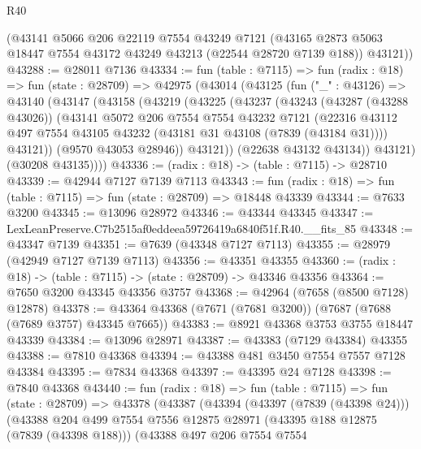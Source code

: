 \begin{lexlean}{R40}
\begin{coremodule}
      (@43141
        @5066
        @206
        @22119
        @7554
        @43249
        @7121
        (@43165 @2873 @5063 @18447 @7554 @43172 @43249 @43213 (@22544 @28720 @7139 @188))
        @43121))
@43288 := @28011 @7136
@43334 := fun (table : @7115) =>
  fun (radix : @18) =>
  fun (state : @28709) =>
  @42975
    (@43014
      (@43125
        (fun ("_" : @43126) =>
        @43140
          (@43147
            (@43158
              (@43219
                (@43225
                  (@43237
                    (@43243
                      (@43287 (@43288 @43026))
                      (@43141
                        @5072
                        @206
                        @7554
                        @7554
                        @43232
                        @7121
                        (@22316
                          @43112
                          @497
                          @7554
                          @43105
                          @43232
                          (@43181 @31 @43108 (@7839 (@43184 @31))))
                        @43121))
                    (@9570 @43053 @28946))
                  @43121))
              (@22638 @43132 @43134))
            @43121)
          (@30208 @43135))))
@43336 := (radix : @18) -> (table : @7115) -> @28710
@43339 := @42944 @7127 @7139 @7113
@43343 := fun (radix : @18) => fun (table : @7115) => fun (state : @28709) => @18448 @43339
@43344 := @7633 @3200
@43345 := @13096 @28972
@43346 := @43344 @43345
@43347 := LexLeanPreserve.C7b2515af0eddeea59726419a6840f51f.R40.__fits_85
@43348 := @43347 @7139
@43351 := @7639 (@43348 @7127 @7113)
@43355 := @28979 (@42949 @7127 @7139 @7113)
@43356 := @43351 @43355
@43360 := (radix : @18) -> (table : @7115) -> (state : @28709) -> @43346 @43356
@43364 := @7650 @3200 @43345 @43356 @3757
@43368 := @42964 (@7658 (@8500 @7128) @12878)
@43378 := @43364 @43368 (@7671 (@7681 @3200)) (@7687 (@7688 (@7689 @3757) @43345 @7665))
@43383 := @8921 @43368 @3753 @3755 @18447 @43339
@43384 := @13096 @28971
@43387 := @43383 (@7129 @43384) @43355
@43388 := @7810 @43368
@43394 := @43388 @481 @3450 @7554 @7557 @7128 @43384
@43395 := @7834 @43368
@43397 := @43395 @24 @7128
@43398 := @7840 @43368
@43440 := fun (radix : @18) =>
  fun (table : @7115) =>
  fun (state : @28709) =>
  @43378
    (@43387
      (@43394
        (@43397 (@7839 (@43398 @24)))
        (@43388
          @204
          @499
          @7554
          @7556
          @12875
          @28971
          (@43395 @188 @12875 (@7839 (@43398 @188)))
          (@43388
            @497
            @206
            @7554
            @7554

\end{coremodule}
\end{lexlean}
